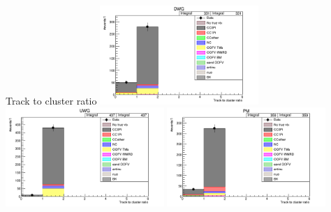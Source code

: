 \documentclass{beamer}
\begin{document}
\begin{frame}{Track to cluster ratio}
    \includegraphics[width=0.45\textwidth]{images/track_to_cluster_hits_ratio_wgbm_topo_DWG_accum_level[][26]_data_mc.png}
    \includegraphics[width=0.45\textwidth]{images/track_to_cluster_hits_ratio_wgbm_topo_UWG_accum_level[][16]_data_mc.png}
    \includegraphics[width=0.45\textwidth]{images/track_to_cluster_hits_ratio_wgbm_topo_PM_accum_level[][06]_data_mc.png}
\end{frame}
\end{document}
